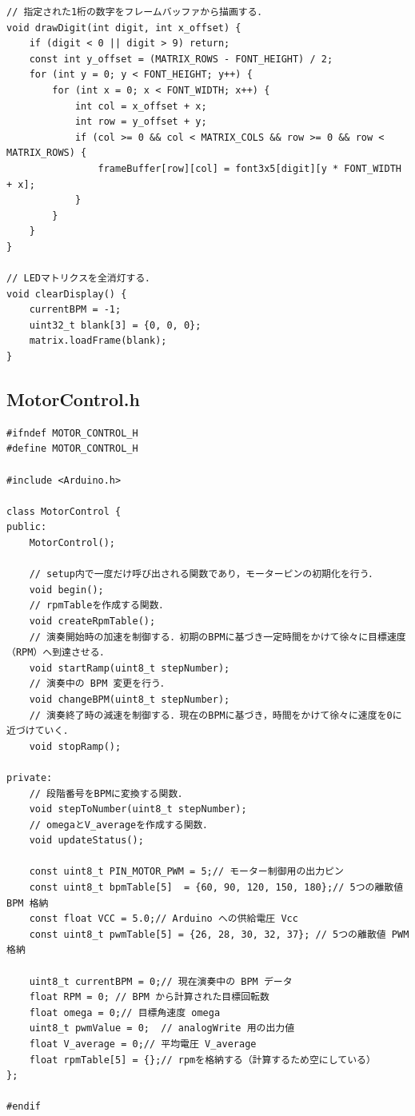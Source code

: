 \begin{lstlisting}[caption={Display.cpp}, label={lst:disp_cpp}]
// 指定された1桁の数字をフレームバッファから描画する．
void drawDigit(int digit, int x_offset) {
    if (digit < 0 || digit > 9) return;
    const int y_offset = (MATRIX_ROWS - FONT_HEIGHT) / 2;
    for (int y = 0; y < FONT_HEIGHT; y++) {
        for (int x = 0; x < FONT_WIDTH; x++) {
            int col = x_offset + x;
            int row = y_offset + y;
            if (col >= 0 && col < MATRIX_COLS && row >= 0 && row < MATRIX_ROWS) {
                frameBuffer[row][col] = font3x5[digit][y * FONT_WIDTH + x];
            }
        }
    }
}

// LEDマトリクスを全消灯する．
void clearDisplay() {
    currentBPM = -1;
    uint32_t blank[3] = {0, 0, 0};
    matrix.loadFrame(blank);
}
\end{lstlisting}

\subsection{MotorControl.h}
\begin{lstlisting}[caption={MotorControl.h}, label={lst:motor_h}]
#ifndef MOTOR_CONTROL_H
#define MOTOR_CONTROL_H

#include <Arduino.h>

class MotorControl {
public:
    MotorControl();
    
    // setup内で一度だけ呼び出される関数であり，モーターピンの初期化を行う．
    void begin();
    // rpmTableを作成する関数．
    void createRpmTable();
    // 演奏開始時の加速を制御する．初期のBPMに基づき一定時間をかけて徐々に目標速度（RPM）へ到達させる．
    void startRamp(uint8_t stepNumber);
    // 演奏中の BPM 変更を行う．
    void changeBPM(uint8_t stepNumber);
    // 演奏終了時の減速を制御する．現在のBPMに基づき，時間をかけて徐々に速度を0に近づけていく．
    void stopRamp();

private:
    // 段階番号をBPMに変換する関数．
    void stepToNumber(uint8_t stepNumber);
    // omegaとV_averageを作成する関数．
    void updateStatus();

    const uint8_t PIN_MOTOR_PWM = 5;// モーター制御用の出力ピン
    const uint8_t bpmTable[5]  = {60, 90, 120, 150, 180};// 5つの離散値 BPM 格納
    const float VCC = 5.0;// Arduino への供給電圧 Vcc
    const uint8_t pwmTable[5] = {26, 28, 30, 32, 37}; // 5つの離散値 PWM 格納

    uint8_t currentBPM = 0;// 現在演奏中の BPM データ
    float RPM = 0; // BPM から計算された目標回転数
    float omega = 0;// 目標角速度 omega
    uint8_t pwmValue = 0;  // analogWrite 用の出力値
    float V_average = 0;// 平均電圧 V_average
    float rpmTable[5] = {};// rpmを格納する（計算するため空にしている）
};

#endif
\end{lstlisting}

